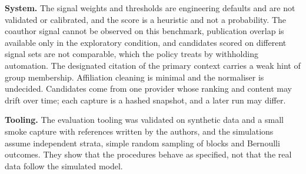 \textbf{System.} The signal weights and thresholds are engineering defaults and are not validated or calibrated, and the score is a heuristic and not a probability. The coauthor signal cannot be observed on this benchmark, publication overlap is available only in the exploratory condition, and candidates scored on different signal sets are not comparable, which the policy treats by withholding automation. The designated citation of the primary context carries a weak hint of group membership. Affiliation cleaning is minimal and the normaliser is undecided. Candidates come from one provider whose ranking and content may drift over time; each capture is a hashed snapshot, and a later run may differ.

\textbf{Tooling.} The evaluation tooling was validated on synthetic data and a small smoke capture with references written by the authors, and the simulations assume independent strata, simple random sampling of blocks and Bernoulli outcomes. They show that the procedures behave as specified, not that the real data follow the simulated model.
